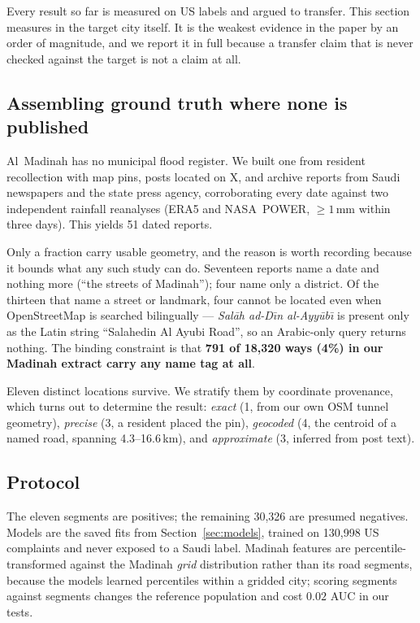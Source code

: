 \documentclass[11pt]{article}
\begin{document}
Every result so far is measured on US labels and argued to transfer. This
section measures in the target city itself. It is the weakest evidence in the
paper by an order of magnitude, and we report it in full because a transfer
claim that is never checked against the target is not a claim at all.

\subsection{Assembling ground truth where none is published}

Al~Madinah has no municipal flood register. We built one from resident
recollection with map pins, posts located on X, and archive reports from Saudi
newspapers and the state press agency, corroborating every date against two
independent rainfall reanalyses (ERA5 and NASA~POWER, $\ge 1$\,mm within three
days). This yields 51 dated reports.

Only a fraction carry usable geometry, and the reason is worth recording
because it bounds what any such study can do. Seventeen reports name a date and
nothing more (``the streets of Madinah''); four name only a district. Of the
thirteen that name a street or landmark, four cannot be located even when
OpenStreetMap is searched bilingually --- \emph{Sal\=ah ad-D\={\i}n al-Ayy\=ub\={\i}}
is present only as the Latin string ``Salahedin Al Ayubi Road'', so an
Arabic-only query returns nothing. The binding constraint is that
\textbf{791 of 18{,}320 ways (4\%) in our Madinah extract carry any name tag at
all}.

Eleven distinct locations survive. We stratify them by coordinate provenance,
which turns out to determine the result:
\emph{exact} (1, from our own OSM tunnel geometry),
\emph{precise} (3, a resident placed the pin),
\emph{geocoded} (4, the centroid of a named road, spanning 4.3--16.6\,km),
and \emph{approximate} (3, inferred from post text).

\subsection{Protocol}

The eleven segments are positives; the remaining 30{,}326 are presumed
negatives. Models are the saved fits from Section~\ref{sec:models}, trained on
130{,}998 US complaints and never exposed to a Saudi label. Madinah features are
percentile-transformed against the Madinah \emph{grid} distribution rather than
its road segments, because the models learned percentiles within a gridded city;
scoring segments against segments changes the reference population and cost
$0.02$ AUC in our tests.
\end{document}
